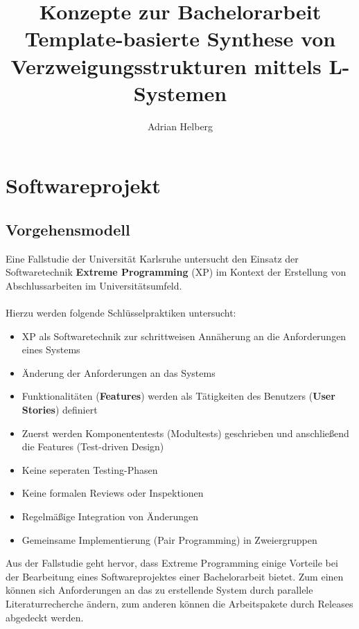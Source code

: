 \documentclass[11pt]{article}
\title{\textbf{Konzepte} zur Bachelorarbeit\\\large{Template-basierte Synthese von\\Verzweigungsstrukturen mittels
L-Systemen}}
\author{Adrian Helberg}
\begin{document}
    \maketitle
    \tableofcontents
    \newpage
    \section{Softwareprojekt}
    \subsection{Vorgehensmodell}
    Eine Fallstudie der Universität Karlsruhe\cite{1} untersucht den Einsatz der Softwaretechnik \textbf{Extreme Programming}
    (XP) im Kontext der Erstellung von Abschlussarbeiten im Universitätsumfeld.\\~\\
    Hierzu werden folgende Schlüsselpraktiken untersucht:
    \begin{itemize}
        \item XP als Softwaretechnik zur schrittweisen Annäherung an die Anforderungen eines Systems
        \item Änderung der Anforderungen an das Systems
        \item Funktionalitäten (\textbf{Features}) werden als Tätigkeiten des Benutzers (\textbf{User Stories}) definiert
        \item Zuerst werden Komponententests (Modultests) geschrieben und anschließend die Features (Test-driven Design)
        \item Keine seperaten Testing-Phasen
        \item Keine formalen Reviews oder Inspektionen
        \item Regelmäßige Integration von Änderungen
        \item Gemeinsame Implementierung (Pair Programming) in Zweiergruppen
    \end{itemize}
    Aus der Fallstudie geht hervor, dass Extreme Programming einige Vorteile bei der Bearbeitung eines Softwareprojektes
    einer Bachelorarbeit bietet.
    Zum einen können sich Anforderungen an das zu erstellende System durch parallele Literaturrecherche ändern, zum
    anderen können die Arbeitspakete durch Releases abgedeckt werden.
    \newpage
\end{document}
